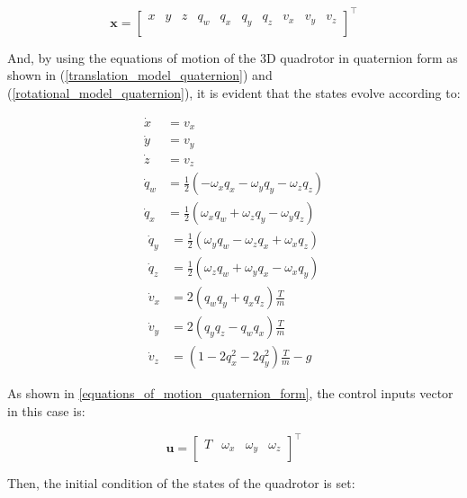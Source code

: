\documentclass{thesisreport}
\begin{document}
\begin{equation}
	\bm{x} = \begin{bmatrix}
		x & y & z & q_w & q_x & q_y & q_z & v_x & v_y & v_z\\
	\end{bmatrix}^{\intercal}
\end{equation}

And, by using the equations of motion of the 3D quadrotor in quaternion form as shown in (\ref{translation_model_quaternion}) and (\ref{rotational_model_quaternion}), it is evident that the states evolve according to: 

\begin{multicols}{2}
            \begin{align}
                \dot{x} &= v_x \\
                \dot{y} &= v_y \\
                \dot{z} &= v_z \\
                \dot{q}_w &=\frac{1}{2}( - \omega_x q_x - \omega_y q_y - \omega_z q_z) \\
                \dot{q}_x &=\frac{1}{2}( \omega_x q_w + \omega_z q_y - \omega_y q_z)
            \end{align}
        \columnbreak
            \begin{align}
                \dot{q}_y &=\frac{1}{2}( \omega_y q_w - \omega_z q_x + \omega_x q_z) \\
                \dot{q}_z &=\frac{1}{2}( \omega_z q_w + \omega_y q_x - \omega_x q_y) \\
                \dot{v}_x &= 2( q_w q_y + q_x q_z )\frac{T}{m} \\
                \dot{v}_y &= 2(q_y q_z - q_w q_x )\frac{T}{m} \\
                \dot{v}_z &= ( 1 - 2 q_x^2 - 2 q_y^2 )\frac{T}{m} - g
            \end{align}
\end{multicols}

As shown in \ref{equations_of_motion_quaternion_form}, the control inputs vector in this case is: 

\begin{equation}
	\bm{u} = \begin{bmatrix}
		T & \omega_x & \omega_y & \omega_z \\
	\end{bmatrix}^{\intercal}
\end{equation}

Then, the initial condition of the states of the quadrotor is set:
\end{document}
